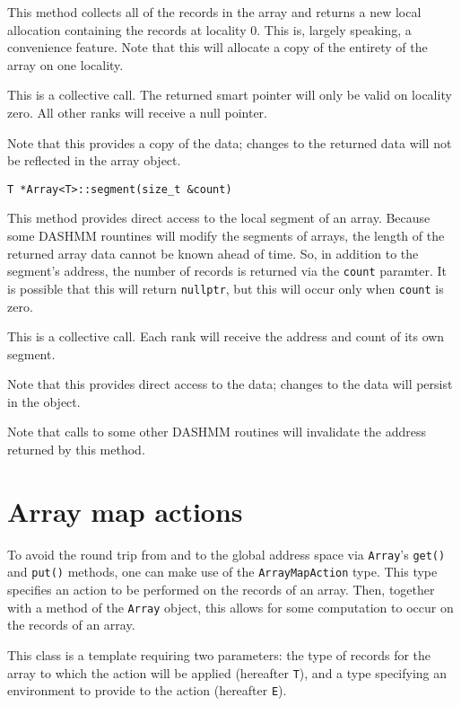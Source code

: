 \noindent This method collects all of the records in the array and returns a
new local allocation containing the records at locality 0. This is, largely
speaking, a convenience feature. Note that this will allocate a copy of the
entirety of the array on one locality.

This is a collective call. The returned smart pointer will only be valid on
locality zero. All other ranks will receive a null pointer.

Note that this provides a copy of the data; changes to the returned data will
not be reflected in the array object.

\begin{lstlisting}
T *Array<T>::segment(size_t &count)
\end{lstlisting}

\noindent This method provides direct access to the local segment of an array.
Because some DASHMM rountines will modify the segments of arrays, the length
of the returned array data cannot be known ahead of time. So, in addition to
the segment's address, the number of records is returned via the \texttt{count}
paramter. It is possible that this will return \texttt{nullptr}, but this will
occur only when \texttt{count} is zero.

This is a collective call. Each rank will receive the address and count of its
own segment.

Note that this provides direct access to the data; changes to the data will
persist in the object.

Note that calls to some other DASHMM routines will invalidate the address
returned by this method.


\section{Array map actions}

To avoid the round trip from and to the global address space via
\texttt{Array}'s \texttt{get()} and \texttt{put()} methods, one can make use
of the \texttt{ArrayMapAction} type. This type specifies an action to be
performed on the records of an array. Then, together with a method of the
\texttt{Array} object, this allows for some computation to occur on the
records of an array.

This class is a template requiring two parameters: the type of records for
the array to which the action will be applied (hereafter \texttt{T}), and a
type specifying an environment to provide to the action (hereafter \texttt{E}).


